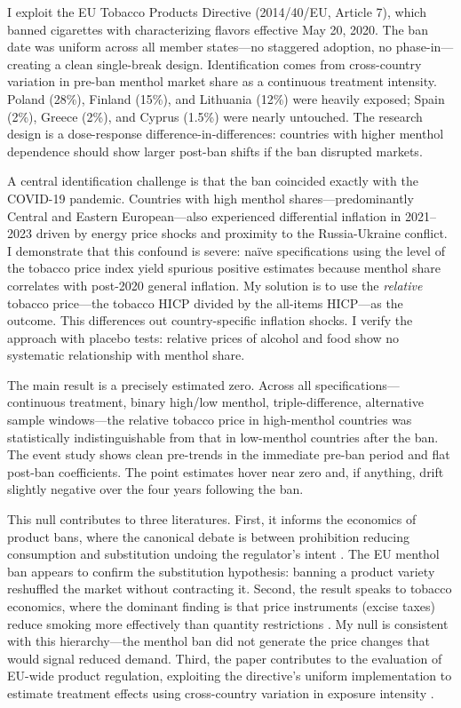 \documentclass[12pt]{article}
\begin{document}
I exploit the EU Tobacco Products Directive (2014/40/EU, Article 7), which banned cigarettes with characterizing flavors effective May 20, 2020. The ban date was uniform across all member states---no staggered adoption, no phase-in---creating a clean single-break design. Identification comes from cross-country variation in pre-ban menthol market share as a continuous treatment intensity. Poland (28\%), Finland (15\%), and Lithuania (12\%) were heavily exposed; Spain (2\%), Greece (2\%), and Cyprus (1.5\%) were nearly untouched. The research design is a dose-response difference-in-differences: countries with higher menthol dependence should show larger post-ban shifts if the ban disrupted markets.

A central identification challenge is that the ban coincided exactly with the COVID-19 pandemic. Countries with high menthol shares---predominantly Central and Eastern European---also experienced differential inflation in 2021--2023 driven by energy price shocks and proximity to the Russia-Ukraine conflict. I demonstrate that this confound is severe: na\"ive specifications using the level of the tobacco price index yield spurious positive estimates because menthol share correlates with post-2020 general inflation. My solution is to use the \textit{relative} tobacco price---the tobacco HICP divided by the all-items HICP---as the outcome. This differences out country-specific inflation shocks. I verify the approach with placebo tests: relative prices of alcohol and food show no systematic relationship with menthol share.

The main result is a precisely estimated zero. Across all specifications---continuous treatment, binary high/low menthol, triple-difference, alternative sample windows---the relative tobacco price in high-menthol countries was statistically indistinguishable from that in low-menthol countries after the ban. The event study shows clean pre-trends in the immediate pre-ban period and flat post-ban coefficients. The point estimates hover near zero and, if anything, drift slightly negative over the four years following the ban.

This null contributes to three literatures. First, it informs the economics of product bans, where the canonical debate is between prohibition reducing consumption \citep{miron2004drug} and substitution undoing the regulator's intent \citep{gruber2001tobacco}. The EU menthol ban appears to confirm the substitution hypothesis: banning a product variety reshuffled the market without contracting it. Second, the result speaks to tobacco economics, where the dominant finding is that price instruments (excise taxes) reduce smoking more effectively than quantity restrictions \citep{chaloupka2000economics, gruber2001tobacco}. My null is consistent with this hierarchy---the menthol ban did not generate the price changes that would signal reduced demand. Third, the paper contributes to the evaluation of EU-wide product regulation, exploiting the directive's uniform implementation to estimate treatment effects using cross-country variation in exposure intensity \citep{angrist2009mostly}.
\end{document}
